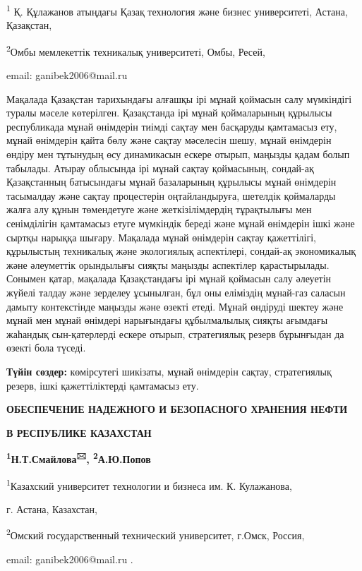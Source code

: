 \textsuperscript{1} Қ. Құлажанов атыңдағы Қазақ технология және бизнес
университеті, Астана, Қазақстан,

\textsuperscript{2}Омбы мемлекеттік техникалық университеті, Омбы,
Ресей,

email: ganibek2006@mail.ru

Мақалада Қазақстан тарихындағы алғашқы ірі мұнай қоймасын салу
мүмкіндігі туралы мәселе көтерілген. Қазақстанда ірі мұнай қоймаларының
құрылысы республикада мұнай өнімдерін тиімді сақтау мен басқаруды
қамтамасыз ету, мұнай өнімдерін қайта бөлу және сақтау мәселесін шешу,
мұнай өнімдерін өндіру мен тұтынудың өсу динамикасын ескере отырып,
маңызды қадам болып табылады. Атырау облысында ірі мұнай сақтау
қоймасының, сондай-ақ Қазақстанның батысындағы мұнай базаларының
құрылысы мұнай өнімдерін тасымалдау және сақтау процестерін
оңтайландыруға, шетелдік қоймаларды жалға алу құнын төмендетуге және
жеткізілімдердің тұрақтылығы мен сенімділігін қамтамасыз етуге мүмкіндік
береді және мұнай өнімдерін ішкі және сыртқы нарыққа шығару. Мақалада
мұнай өнімдерін сақтау қажеттілігі, құрылыстың техникалық және
экологиялық аспектілері, сондай-ақ экономикалық және әлеуметтік
орындылығы сияқты маңызды аспектілер қарастырылады. Сонымен қатар,
мақалада Қазақстандағы ірі мұнай қоймасын салу әлеуетін жүйелі талдау
және зерделеу ұсынылған, бұл оны еліміздің мұнай-газ саласын дамыту
контекстінде маңызды және өзекті етеді. Мұнай өндіруді шектеу және мұнай
мен мұнай өнімдері нарығындағы құбылмалылық сияқты ағымдағы жаһандық
сын-қатерлерді ескере отырып, стратегиялық резерв бұрынғыдан да өзекті
бола түседі.

{\bfseries Түйін сөздер:} көмірсутегі шикізаты, мұнай өнімдерін сақтау,
стратегиялық резерв, ішкі қажеттіліктерді қамтамасыз ету.

{\bfseries ОБЕСПЕЧЕНИЕ НАДЕЖНОГО И БЕЗОПАСНОГО ХРАНЕНИЯ НЕФТИ}

{\bfseries В РЕСПУБЛИКЕ КАЗАХСТАН}

{\bfseries \textsuperscript{1}Н.Т.Смайлова\textsuperscript{🖂},
\textsuperscript{2}А.Ю.Попов}

\textsuperscript{1}Казахский университет технологии и бизнеса им. К.
Кулажанова,

г. Астана, Казахстан,

\textsuperscript{2}Омский государственный технический университет,
г.Омск, Россия,

email: ganibek2006@mail.ru .

